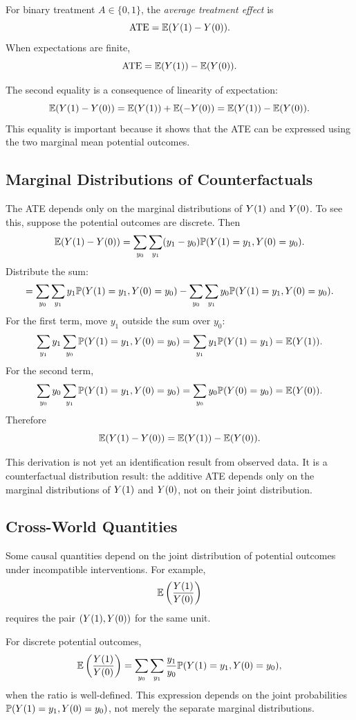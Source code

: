 \begin{definition}
For binary treatment $A\in\{0,1\}$, the \emph{average treatment effect} is
\[
\operatorname{ATE}=\mathbb{E}(Y(1)-Y(0)).
\]
When expectations are finite,
\[
\operatorname{ATE}=\mathbb{E}(Y(1))-\mathbb{E}(Y(0)).
\]
\end{definition}

The second equality is a consequence of linearity of expectation:
\[
\mathbb{E}(Y(1)-Y(0))
=\mathbb{E}(Y(1))+\mathbb{E}(-Y(0))
=\mathbb{E}(Y(1))-\mathbb{E}(Y(0)).
\]
This equality is important because it shows that the ATE can be expressed using the two marginal mean potential outcomes.

\subsection{Marginal Distributions of Counterfactuals}

The ATE depends only on the marginal distributions of $Y(1)$ and $Y(0)$. To see this, suppose the potential outcomes are discrete. Then
\[
\mathbb{E}(Y(1)-Y(0))
=
\sum_{y_0}\sum_{y_1}(y_1-y_0)
\mathbb{P}(Y(1)=y_1,Y(0)=y_0).
\]
Distribute the sum:
\[
=
\sum_{y_0}\sum_{y_1}y_1\mathbb{P}(Y(1)=y_1,Y(0)=y_0)
-
\sum_{y_0}\sum_{y_1}y_0\mathbb{P}(Y(1)=y_1,Y(0)=y_0).
\]
For the first term, move $y_1$ outside the sum over $y_0$:
\[
\sum_{y_1}y_1\sum_{y_0}\mathbb{P}(Y(1)=y_1,Y(0)=y_0)
=
\sum_{y_1}y_1\mathbb{P}(Y(1)=y_1)
=
\mathbb{E}(Y(1)).
\]
For the second term,
\[
\sum_{y_0}y_0\sum_{y_1}\mathbb{P}(Y(1)=y_1,Y(0)=y_0)
=
\sum_{y_0}y_0\mathbb{P}(Y(0)=y_0)
=
\mathbb{E}(Y(0)).
\]
Therefore
\[
\mathbb{E}(Y(1)-Y(0))=\mathbb{E}(Y(1))-\mathbb{E}(Y(0)).
\]

\begin{identificationbox}
This derivation is not yet an identification result from observed data. It is a counterfactual distribution result: the additive ATE depends only on the marginal distributions of $Y(1)$ and $Y(0)$, not on their joint distribution.
\end{identificationbox}

\subsection{Cross-World Quantities}

Some causal quantities depend on the joint distribution of potential outcomes under incompatible interventions. For example,
\[
\mathbb{E}\left(\frac{Y(1)}{Y(0)}\right)
\]
requires the pair $(Y(1),Y(0))$ for the same unit.

For discrete potential outcomes,
\[
\mathbb{E}\left(\frac{Y(1)}{Y(0)}\right)
=
\sum_{y_0}\sum_{y_1}
\frac{y_1}{y_0}
\mathbb{P}(Y(1)=y_1,Y(0)=y_0),
\]
when the ratio is well-defined. This expression depends on the joint probabilities $\mathbb{P}(Y(1)=y_1,Y(0)=y_0)$, not merely the separate marginal distributions.

